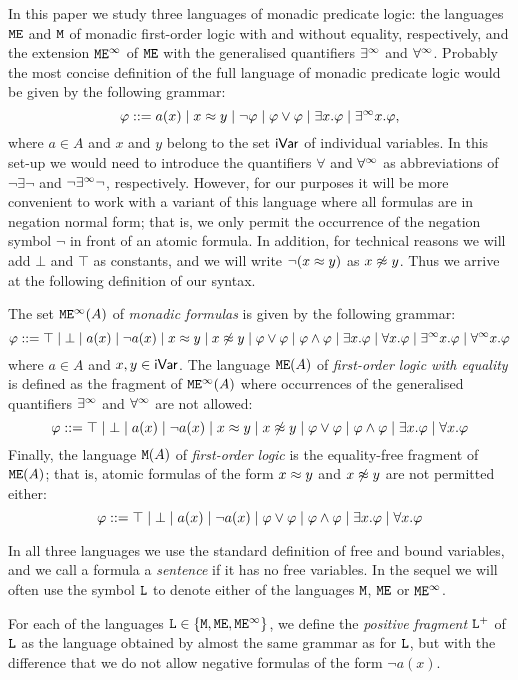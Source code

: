 In this paper we study three languages of monadic predicate logic: the languages 
$\mathtt{M}\mathtt{E}$ and $\mathtt{M}$ of monadic first-order logic with and without equality, 
respectively, and the extension $\mathtt{M}\mathtt{E}^{\infty}$ of $\mathtt{M}\mathtt{E}$ with the 
generalised quantifiers $\exists^\infty$ and $\forall^\infty$.
Probably the most concise definition of the full language of monadic predicate 
logic would be given by the following grammar:
\[
\varphi \mathrel{::=} a(x)
\mid x \approx y
\mid \neg \varphi
\mid \varphi \lor \varphi
\mid \exists x.\varphi
\mid \exists^\infty x.\varphi,
\]
where $a \in A$ and $x$ and $y$ belong to the set $\mathsf{iVar}$ of individual 
variables.
In this set-up we would need to introduce the quantifiers $\forall$ and $\forall^\infty$ 
as abbreviations of $\neg \exists \neg$ and $\neg \exists^\infty \neg$, respectively.
However, for our purposes it will be more convenient to work with a variant of 
this language where all formulas are in negation normal form; that is, we only 
permit the occurrence of the negation symbol $\neg$ in front of an atomic 
formula.
In addition, for technical reasons we will add $\bot$ and $\top$ as constants,
and we will write $\neg (x \approx y)$ as $x \not\approx y$.
Thus we arrive at the following definition of our syntax.

\begin{definition}
The set $\mathtt{M}\mathtt{E}^{\infty}(A)$ of \emph{monadic formulas} is given by the following grammar:
\[
\varphi \mathrel{::=}
\top \mid \bot 
\mid a(x)
\mid \neg a(x)
\mid x \approx y
\mid x \not\approx y
\mid \varphi \lor \varphi
\mid \varphi \land \varphi
\mid \exists x.\varphi
\mid \forall x.\varphi
\mid \exists^\infty x.\varphi
\mid \forall^\infty x.\varphi
\]
where $a \in A$ and $x,y\in \mathsf{iVar}$. 
The language $\mathtt{M}\mathtt{E}(A)$ of \emph{first-order logic with equality} is defined as
the fragment of $\mathtt{M}\mathtt{E}^{\infty}(A)$ where occurrences of the generalised quantifiers 
$\exists^\infty$ and $\forall^\infty$ are not allowed:
\[
\varphi \mathrel{::=}
\top \mid \bot 
\mid a(x)
\mid \neg a(x)
\mid x \approx y
\mid x \not\approx y
\mid \varphi \lor \varphi
\mid \varphi \land \varphi
\mid \exists x.\varphi
\mid \forall x.\varphi
\]
Finally, the language $\mathtt{M}(A)$ of \emph{first-order logic} is the equality-free
fragment of $\mathtt{M}\mathtt{E}(A)$; that is, atomic formulas of the form $x \approx y$ and 
$x \not\approx y$ are not permitted either:
\[
\varphi \mathrel{::=}
\top \mid \bot 
\mid a(x)
\mid \neg a(x)
\mid \varphi \lor \varphi
\mid \varphi \land \varphi
\mid \exists x.\varphi
\mid \forall x.\varphi
\]

In all three languages we use the standard definition of free and bound
variables, and we call a formula a \emph{sentence} if it has no free variables.
In the sequel we will often use the symbol $\mathtt{L}$ to denote either of the 
languages $\mathtt{M}$, $\mathtt{M}\mathtt{E}$ or $\mathtt{M}\mathtt{E}^{\infty}$.

For each of the languages $\mathtt{L} \in \{ \mathtt{M}, \mathtt{M}\mathtt{E}, \mathtt{M}\mathtt{E}^{\infty} \}$, we define the 
\emph{positive fragment} $\mathtt{L}^{+}$ of $\mathtt{L}$ as the language obtained by 
almost the same grammar as for $\mathtt{L}$, but with the difference that we do not
allow negative formulas of the form $\neg a(x)$.
\end{definition}

